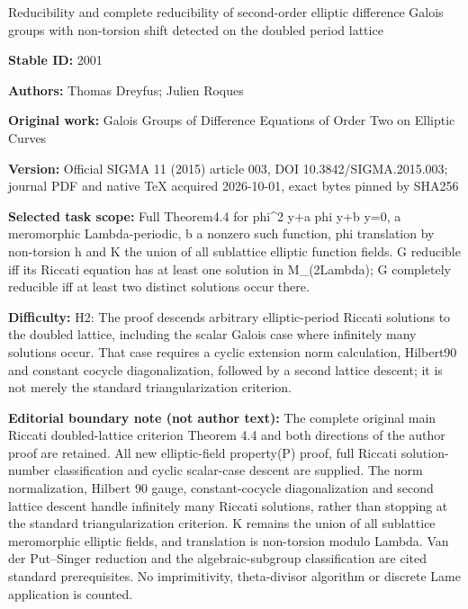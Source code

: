 \documentclass[11pt]{article}
\numberwithin{equation}{section}
\begin{document}
\begin{center}\Large Reducibility and complete reducibility of second-order elliptic difference Galois groups with non-torsion shift detected on the doubled period lattice\end{center}
\noindent\textbf{Stable ID:} 2001\par
\noindent\textbf{Authors:} Thomas Dreyfus; Julien Roques\par
\noindent\textbf{Original work:} Galois Groups of Difference Equations of Order Two on Elliptic Curves\par
\noindent\textbf{Version:} Official SIGMA 11 (2015) article 003, DOI 10.3842/SIGMA.2015.003; journal PDF and native TeX acquired 2026-10-01, exact bytes pinned by SHA256\par
\noindent\textbf{Selected task scope:} Full Theorem4.4 for phi\textasciicircum{}2 y+\allowbreak{}a phi y+\allowbreak{}b y=\allowbreak{}0, a meromorphic Lambda-periodic, b a nonzero such function, phi translation by non-torsion h and K the union of all sublattice elliptic function fields. G reducible iff its Riccati equation has at least one solution in M\_(2Lambda); G completely reducible iff at least two distinct solutions occur there.\par
\noindent\textbf{Difficulty:} H2: The proof descends arbitrary elliptic-period Riccati solutions to the doubled lattice, including the scalar Galois case where infinitely many solutions occur. That case requires a cyclic extension norm calculation, Hilbert90 and constant cocycle diagonalization, followed by a second lattice descent; it is not merely the standard triangularization criterion.\par
\noindent\textbf{Editorial boundary note (not author text):} The complete original main Riccati doubled-lattice criterion Theorem 4.4 and both directions of the author proof are retained. All new elliptic-field property(P) proof, full Riccati solution-number classification and cyclic scalar-case descent are supplied. The norm normalization, Hilbert 90 gauge, constant-cocycle diagonalization and second lattice descent handle infinitely many Riccati solutions, rather than stopping at the standard triangularization criterion. K remains the union of all sublattice meromorphic elliptic fields, and translation is non-torsion modulo Lambda. Van der Put–Singer reduction and the algebraic-subgroup classification are cited standard prerequisites. No imprimitivity, theta-divisor algorithm or discrete Lame application is counted.\par
\end{document}
